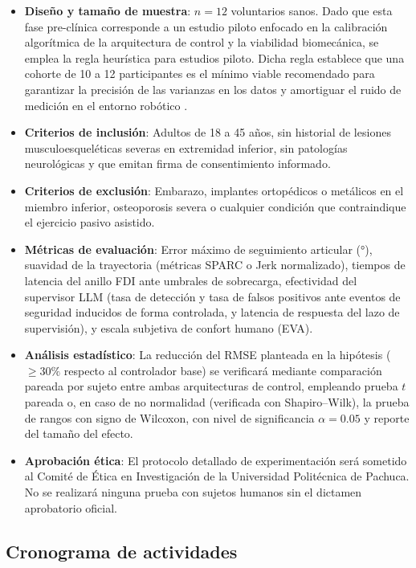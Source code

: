 \documentclass[a4paper,12pt]{article}
\begin{document}
\begin{itemize}
    \item \textbf{Diseño y tamaño de muestra}: $n = 12$ voluntarios sanos. Dado que esta fase pre-clínica corresponde a un estudio piloto enfocado en la calibración algorítmica de la arquitectura de control y la viabilidad biomecánica, se emplea la regla heurística para estudios piloto. Dicha regla establece que una cohorte de 10 a 12 participantes es el mínimo viable recomendado para garantizar la precisión de las varianzas en los datos y amortiguar el ruido de medición en el entorno robótico \citep{julious2005sample}.
    \item \textbf{Criterios de inclusión}: Adultos de 18 a 45 años, sin historial de lesiones musculoesqueléticas severas en extremidad inferior, sin patologías neurológicas y que emitan firma de consentimiento informado.
    \item \textbf{Criterios de exclusión}: Embarazo, implantes ortopédicos o metálicos en el miembro inferior, osteoporosis severa o cualquier condición que contraindique el ejercicio pasivo asistido.
    \item \textbf{Métricas de evaluación}: Error máximo de seguimiento articular (°), suavidad de la trayectoria (métricas SPARC o Jerk normalizado), tiempos de latencia del anillo FDI ante umbrales de sobrecarga, efectividad del supervisor LLM (tasa de detección y tasa de falsos positivos ante eventos de seguridad inducidos de forma controlada, y latencia de respuesta del lazo de supervisión), y escala subjetiva de confort humano (EVA).
    \item \textbf{Análisis estadístico}: La reducción del RMSE planteada en la hipótesis ($\geq 30\%$ respecto al controlador base) se verificará mediante comparación pareada por sujeto entre ambas arquitecturas de control, empleando prueba $t$ pareada o, en caso de no normalidad (verificada con Shapiro--Wilk), la prueba de rangos con signo de Wilcoxon, con nivel de significancia $\alpha = 0.05$ y reporte del tamaño del efecto.
    \item \textbf{Aprobación ética}: El protocolo detallado de experimentación será sometido al Comité de Ética en Investigación de la Universidad Politécnica de Pachuca. No se realizará ninguna prueba con sujetos humanos sin el dictamen aprobatorio oficial.
\end{itemize}

\newpage

\subsection{Cronograma de actividades}

\end{document}
